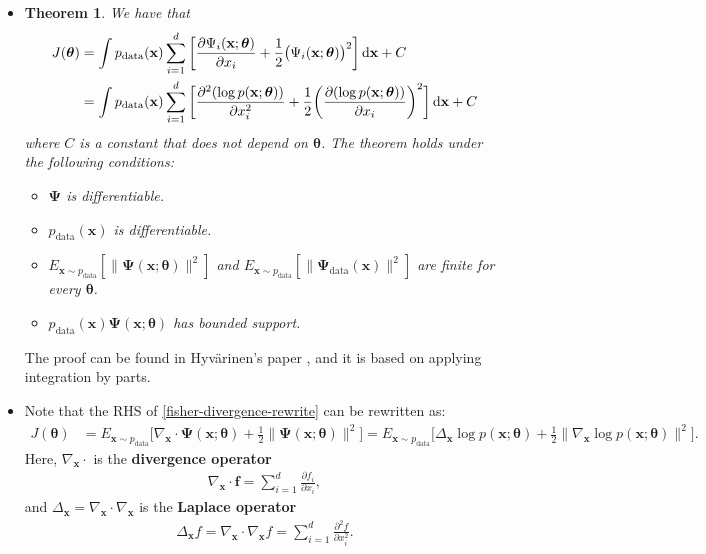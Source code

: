 \documentclass[10pt]{article}
\newtheorem{theorem}[lemma]{Theorem}
\newcommand{\dee}{\mathrm{d}}
\newcommand{\ve}[1]{\mathbf{#1}}
\newcommand{\mrm}[1]{\mathrm{#1}}
\newcommand{\ves}[1]{\boldsymbol{#1}}
\begin{document}
\begin{itemize}
  \item \begin{theorem} \label{thm:score-matching}
  We have that
  \begin{align}
      J(\ves{\theta}) 
      &= \int p_{\mrm{data}}(\ve{x}) \sum_{i=1}^d \bigg[ \frac{\partial \Psi_i(\ve{x};\boldsymbol{\theta})}{\partial x_i} + \frac{1}{2} \big( \Psi_i(\ve{x};\boldsymbol{\theta}) \big)^2 \bigg]\, \dee\ve{x} + C \notag\\
      &= \int p_{\mrm{data}}(\ve{x}) \sum_{i=1}^d \bigg[ 
      \frac{\partial^2 (\log p(\ve{x};\boldsymbol{\theta}))}{\partial x_i^2}
      + \frac{1}{2} \bigg( \frac{\partial(\log p(\ve{x};\boldsymbol{\theta}))}{\partial x_i} \bigg)^2
      \bigg]\, \dee\ve{x} + C \label{fisher-divergence-rewrite}
  \end{align}
  where $C$ is a constant that does not depend on $\boldsymbol{\theta}$. The theorem holds under the following conditions:
  \begin{itemize}
    \item $\boldsymbol{\Psi}$ is differentiable.
    \item $p_{\mrm{data}}(\ve{x})$ is differentiable.
    \item $E_{\ve{x} \sim p_{\mrm{data}}}[\| \boldsymbol{\Psi}(\ve{x};\boldsymbol{\theta}) \|^2]$ and $E_{\ve{x} \sim p_{\mrm{data}}}[\| \boldsymbol{\Psi}_{\mrm{data}}(\ve{x}) \|^2]$ are finite for every $\boldsymbol{\theta}$.
    \item $p_{\mrm{data}}(\ve{x})\boldsymbol{\Psi}(\ve{x};\boldsymbol{\theta})$ has bounded support.
  \end{itemize}  
  \end{theorem}
  The proof can be found in Hyv\"{a}rinen's paper \cite{Hyvarinen:2005}, and it is based on applying integration by parts.

  \item Note that the RHS of \eqref{fisher-divergence-rewrite} can be rewritten as:
  \begin{align*}
      J(\ves{\theta}) 
      &= E_{\ve{x} \sim p_{\mrm{data}}} \bigg[ \nabla_{\ve{x}} \cdot \ves{\Psi}(\ve{x};\ves{\theta}) + \frac{1}{2} \| \ves{\Psi}(\ve{x};\ves{\theta}) \|^2 \bigg]
      = E_{\ve{x} \sim p_{\mrm{data}}} \bigg[ \Delta_\ve{x} \log p(\ve{x};\ves{\theta}) + \frac{1}{2} \| \nabla_{\ve{x}} \log p(\ve{x};\ves{\theta}) \|^2 \bigg].
  \end{align*}
  Here, $\nabla_{\ve{x}} \cdot$ is the {\bf divergence operator}
  \begin{align*}
      \nabla_{\ve{x}} \cdot \ve{f} = \sum_{i=1}^d \frac{\partial f_i}{\partial x_i},
  \end{align*}
  and $\Delta_{\ve{x}} = \nabla_{\ve{x}} \cdot \nabla_{\ve{x}}$ is the {\bf Laplace operator}
  \begin{align*}
      \Delta_{\ve{x}} f = \nabla_{\ve{x}} \cdot \nabla_{\ve{x}} f = \sum_{i=1}^d \frac{\partial^2 f}{\partial x_i^2}.
  \end{align*}


\end{itemize}
\end{document}
